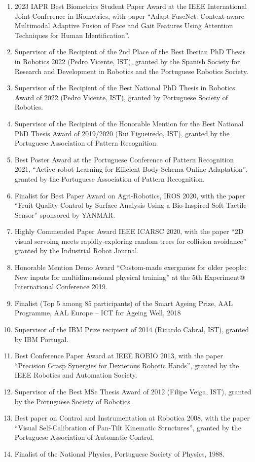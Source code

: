\documentclass[
]{article}
\begin{document}
\begin{enumerate}
\def\labelenumi{\arabic{enumi}.}
\item
  2023 IAPR Best Biometrics Student Paper Award at the IEEE
  International Joint Conference in Biometrics, with paper
  ``Adapt-FuseNet: Context-aware Multimodal Adaptive Fusion of Face and
  Gait Features Using Attention Techniques for Human Identification''.
\item
  Supervisor of the Recipient of the 2nd Place of the Best Iberian PhD
  Thesis in Robotics 2022 (Pedro Vicente, IST), granted by the Spanish
  Society for Research and Development in Robotics and the Portuguese
  Robotics Society.
\item
  Supervisor of the Recipient of the Best National PhD Thesis in
  Robotics Award of 2022 (Pedro Vicente, IST), granted by Portuguese
  Society of Robotics.
\item
  Supervisor of the Recipient of the Honorable Mention for the Best
  National PhD Thesis Award of 2019/2020 (Rui Figueiredo, IST), granted
  by the Portuguese Association of Pattern Recognition.
\item
  Best Poster Award at the Portuguese Conference of Pattern Recognition
  2021, ``Active robot Learning for Efficient Body-Schema Online
  Adaptation'', granted by the Portuguese Association of Pattern
  Recognition.
\item
  Finalist for Best Paper Award on Agri-Robotics, IROS 2020, with the
  paper ``Fruit Quality Control by Surface Analysis Using a Bio-Inspired
  Soft Tactile Sensor'' sponsored by YANMAR.
\item
  Highly Commended Paper Award IEEE ICARSC 2020, with the paper ``2D
  visual servoing meets rapidly-exploring random trees for collision
  avoidance'' granted by the Industrial Robot Journal.
\item
  Honorable Mention Demo Award ``Custom-made exergames for older people:
  New inputs for multidimensional physical training'' at the 5th
  Experiment@ International Conference 2019.
\item
  Finalist (Top 5 among 85 participants) of the Smart Ageing Prize, AAL
  Programme, AAL Europe -- ICT for Ageing Well, 2018
\item
  Supervisor of the IBM Prize recipient of 2014 (Ricardo Cabral, IST),
  granted by IBM Portugal.
\item
  Best Conference Paper Award at IEEE ROBIO 2013, with the paper
  ``Precision Grasp Synergies for Dexterous Robotic Hands'', granted by
  the IEEE Robotics and Automation Society.
\item
  Supervisor of the Best MSc Thesis Award of 2012 (Filipe Veiga, IST),
  granted by the Portuguese Society of Robotics.
\item
  Best paper on Control and Instrumentation at Robotica 2008, with the
  paper ``Visual Self-Calibration of Pan-Tilt Kinematic Structures'',
  granted by the Portuguese Association of Automatic Control.
\item
  Finalist of the National Physics, Portuguese Society of Physics, 1988.
\end{enumerate}
\end{document}
